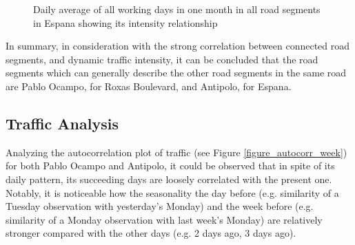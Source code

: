 \begin{figure}[!t] 
\centering
    \centering
      \captionsetup{justification=centering}
    \hfill
    \caption{Daily average of all working days in one month in all road segments in Espana showing its intensity relationship}

    \label{figure_traffic_espana}
\end{figure}

In summary, in consideration with the strong correlation between connected road segments, and dynamic traffic intensity, it can be concluded that the road segments which can generally describe the other road segments in the same road are Pablo Ocampo, for Roxas Boulevard, and Antipolo, for Espana.



\subsection{Traffic Analysis}

Analyzing the autocorrelation plot of traffic (see Figure \ref{figure_autocorr_week}) for both Pablo Ocampo and Antipolo, it could be observed that in spite of its daily pattern, its succeeding days are loosely correlated with the present one. Notably, it is noticeable how the seasonality the day before (e.g. similarity of a Tuesday observation with yesterday’s Monday) and the week before (e.g. similarity of a Monday observation with last week's Monday) are relatively stronger compared with the other days (e.g. 2 days ago, 3 days ago).

